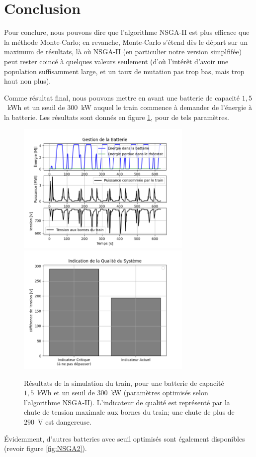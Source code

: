 \documentclass[11pt, a4paper, oneside, portrait]{report}
\begin{document}
    \section*{Conclusion}
        Pour conclure, nous pouvons dire que l'algorithme NSGA-II est plus efficace que la méthode Monte-Carlo; en revanche, Monte-Carlo s'étend dès le départ sur un maximum de résultats, là où NSGA-II (en particulier notre version simplfifée) peut rester coincé à quelques valeurs seulement (d'où l'intérêt d'avoir une population suffisamment large, et un taux de mutation pas trop bas, mais trop haut non plus).

        Comme résultat final, nous pouvons mettre en avant une batterie de capacité $1,5$~kWh et un seuil de $300$~kW auquel le train commence à demander de l'énergie à la batterie.
        Les résultats sont donnés en figure \ref{fig:Con}, pour de tels paramètres.

        \begin{figure}[H]
            \centering
            \includegraphics[width=0.75\textwidth]{Figures/Bat_F.png}
            \includegraphics[width=0.75\textwidth]{Figures/Qual_F.png}
            \caption{Résultats de la simulation du train, pour une batterie de capacité $1,5$~kWh et un seuil de $300$~kW (paramètres optimisés selon l'algorithme NSGA-II). L'indicateur de qualité est représenté par la chute de tension maximale aux bornes du train; une chute de plus de $290$~V est dangereuse.}
            \label{fig:Con}
        \end{figure}

        Évidemment, d'autres batteries avec seuil optimisés sont également disponibles (revoir figure \ref{fig:NSGA2}).
\end{document}

